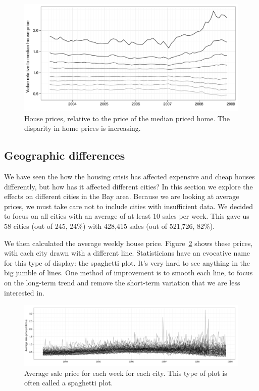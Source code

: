 \documentclass[oneside]{article}
\begin{document}
\begin{figure}[htbp]
  \centering
  \includegraphics[width=0.75\linewidth]{decile-rel}
  \caption{House prices, relative to the price of the median priced home.  The disparity in home prices is increasing.}
  \label{fig:decile-rel}
\end{figure}

\subsection{Geographic differences}

We have seen the how the housing crisis has affected expensive and cheap houses differently, but how has it affected different cities?  In this section we explore the effects on different cities in the Bay area.  Because we are looking at average prices, we must take care not to include cities with insufficient data.  We decided to focus on all cities with an average of at least 10 sales per week. This gave us 58 cities (out of 245, 24\%) with 428,415 sales (out of 521,726, 82\%).  

We then calculated the average weekly house price. Figure~\ref{fig:spaghetti} shows these prices, with each city drawn with a different line.  Statisticians have an evocative name for this type of display: the spaghetti plot.  It's very hard to see anything in the big jumble of lines.  One method of improvement is to smooth each line, to focus on the long-term trend and remove the short-term variation that we are less interested in. 

\begin{figure}[htbp]
  \centering
    \includegraphics[width=0.9\linewidth]{cities-price}
  \caption{Average sale price for each week for each city.  This type of plot is often called a spaghetti plot.}
  \label{fig:spaghetti}
\end{figure}
\end{document}
